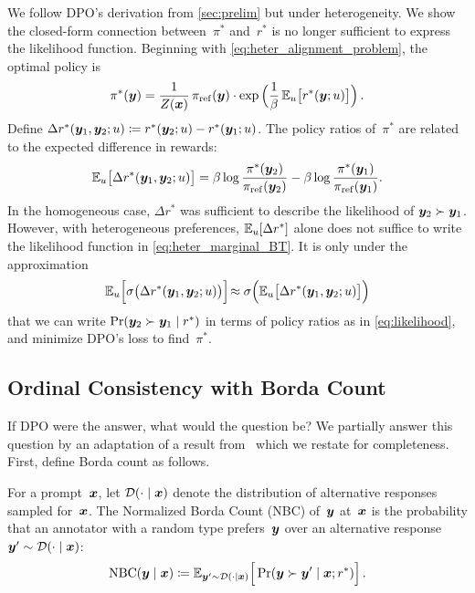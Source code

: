 We follow DPO's derivation from \cref{sec:prelim} but under heterogeneity. We show the closed-form connection between~$\pi^*$ and~$r^*$ is no longer sufficient to express the likelihood function. Beginning with \cref{eq:heter_alignment_problem}, the optimal policy is
%
\begin{equation}
\label{eq:heter_opt_policy}
    \pi^*({\bm{y}}) = \frac{1}{Z({\bm{x}})} \, \pi_{\rm ref}({\bm{y}}) \cdot \exp\Big(\frac{1}{\beta} \, \mathbb{E}_u\big[r^*({\bm{y}}; u)\big]\Big)
    \,.
\end{equation}
%
Define $\Delta r^*({\bm{y}}_1, {\bm{y}}_2; u) \coloneqq r^*({\bm{y}}_2; u) - r^*({\bm{y}}_1; u)$. The policy ratios of~$\pi^*$ are related to the expected difference in rewards:
{\ifnotarxiv\small\fi
\begin{equation}
\begin{aligned}
\label{eq:heter_diff_of_rew}
    \mathbb{E}_u\big[\Delta r^*({\bm{y}}_1, {\bm{y}}_2; u)\big] =
    \beta \log\frac{\pi^*({\bm{y}}_2)}{\pi_{\rm ref}({\bm{y}}_2)} - \beta \log\frac{\pi^*({\bm{y}}_1)}{\pi_{\rm ref}({\bm{y}}_1)}
    .
\end{aligned}
\end{equation}
}In the homogeneous case, $\Delta r^*$ was sufficient to describe the likelihood of ${\bm{y}}_2 \succ {\bm{y}}_1$. However, with heterogeneous preferences, $\mathbb{E}_u[\Delta r^*]$ alone does not suffice to write the likelihood function in \cref{eq:heter_marginal_BT}. It is only under the approximation
%
\begin{equation}
\label{eq:dpo_approx}
    \mathbb{E}_u\Big[\sigma\big(\Delta r^*({\bm{y}}_1, {\bm{y}}_2; u)\big)\Big] \!\approx \sigma\Big(\mathbb{E}_u\big[\Delta r^*({\bm{y}}_1, {\bm{y}}_2; u)\big]\Big)
\end{equation}
%
that we can write $\Pr({\bm{y}}_2 \succ {\bm{y}}_1 \mid r^*)$ in terms of policy ratios as in \cref{eq:likelihood}, and minimize DPO's loss to find~$\pi^*$. 

\subsection{Ordinal Consistency with Borda Count}
\label{sec:borda_count}

If DPO were the answer, what would the question be?
We partially answer this question by an adaptation of a result 
from~\citet{siththaranjan2023distributional} which we restate for completeness. First, define Borda count as follows.
\begin{definition}
For a prompt~${\bm{x}}$, let ${\mathcal{D}}(\cdot \mid {\bm{x}})$ denote the distribution of alternative responses sampled for~${\bm{x}}$. The Normalized Borda Count (NBC) of~${\bm{y}}$ at~${\bm{x}}$ is the probability that an annotator with a random type prefers~${\bm{y}}$ over an alternative response~${\bm{y}}' \sim {\mathcal{D}}(\cdot \mid {\bm{x}})$:
%
\begin{equation}
\label{eq:nbc}
    {\rm NBC}({\bm{y}} \mid {\bm{x}}) \coloneqq \mathbb{E}_{{\bm{y}}' \sim {\mathcal{D}}(\cdot \mid {\bm{x}})} \Big[\Pr({\bm{y}} \succ {\bm{y}}' \mid {\bm{x}}; r^*)\Big] 
    \,.
\end{equation}
%
\end{definition}

